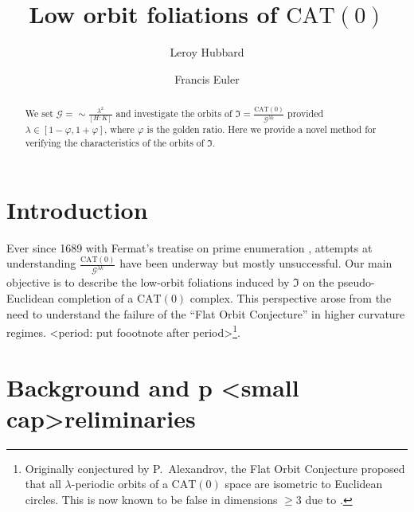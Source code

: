 \documentclass{amsart}
\title{Low orbit foliations of $\mathrm{CAT}(0)$}
\author{Leroy Hubbard}
\author{Francis Euler}
\begin{document}
\begin{abstract}
We set $\mathcal{G} = \sim\frac{\lambda^2}{[H : K]}$ and investigate the orbits of 
$\mathfrak{I} = \frac{\mathrm{CAT}(0)}{\mathcal{G}^{\lambda k}}$ 
provided $\lambda \in [1-\varphi, 1+\varphi]$, where $\varphi$ is the golden ratio. 
Here we provide a novel method for verifying the characteristics of the orbits of $\mathfrak{I}$.
\end{abstract}

\maketitle


\section{Introduction}

Ever since 1689 with Fermat's treatise on prime enumeration \cite{fermat89}, 
attempts at understanding $\frac{\mathrm{CAT}(0)}{\mathcal{G}^{\lambda k}}$ have been underway but mostly unsuccessful. 
Our main objective is to describe the low-orbit foliations induced by $\mathfrak{I}$ on 
the pseudo-Euclidean completion of a $\mathrm{CAT}(0)$ complex. 
This perspective arose from the need to %
understand the failure of the ``Flat Orbit Conjecture'' in higher curvature regimes. <period: put foootnote after period>\footnote{
Originally conjectured by P.\ Alexandrov, the Flat Orbit Conjecture proposed that all $\lambda$-periodic orbits of a $\mathrm{CAT}(0)$ space are isometric to Euclidean circles. 
This is now known to be false in dimensions $\geq 3$ due to \cite{hubard23}.}.

\section{Background and p <small cap>reliminaries}
\end{document}
